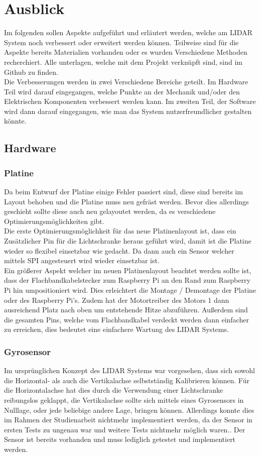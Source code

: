\chapter{Ausblick}\label{chap:ausblick}
Im folgenden sollen Aspekte aufgeführt und erläutert werden, welche am \ac{LIDAR} System noch verbessert oder erweitert werden können. Teilweise sind für die Aspekte bereits Materialien vorhanden oder es wurden Verschiedene Methoden recherchiert. Alle unterlagen, welche mit dem Projekt verknüpft sind, sind im Github zu finden.\\
Die Verbesserungen werden in zwei Verschiedene Bereiche geteilt. Im Hardware Teil wird darauf eingegangen, welche Punkte an der Mechanik und/oder den Elektrischen Komponenten verbessert werden kann. Im zweiten Teil, der Software wird dann darauf eingegangen, wie man das System nutzerfreundlicher gestalten könnte.  
\section{Hardware}
\subsection{Platine}
Da beim Entwurf der Platine einige Fehler passiert sind, diese sind bereits im Layout behoben und die Platine muss neu gefräst werden. Bevor dies allerdings geschieht sollte diese auch neu gelayoutet werden, da es verschiedene Optimierungsmöglichkeiten gibt. \\
Die erste Optimierungsmöglichkeit für das neue Platinenlayout ist, dass ein Zusätzlicher Pin für die Lichtschranke heraus geführt wird, damit ist die Platine wieder so flexibel einsetzbar wie gedacht. Da dann auch ein Sensor welcher mittels \ac{SPI} angesteuert wird wieder einsetzbar ist.\\
Ein größerer Aspekt welcher im neuen Platinenlayout beachtet werden sollte ist, dass der Flachbandkabelstecker zum Raspberry Pi an den Rand zum Raspberry Pi hin umpositioniert wird. Dies erleichtert die Montage / Demontage der Platine oder des Raspberry Pi's. Zudem hat der Motortreiber des Motors 1 dann ausreichend Platz nach oben um entstehende Hitze abzuführen. Außerdem sind die gesamten Pins, welche vom Flachbandkabel verdeckt werden dann einfacher zu erreichen, dies bedeutet eine einfachere Wartung des \ac{LIDAR} Systems.
\subsection{Gyrosensor}
Im ursprünglichen Konzept des \ac{LIDAR} Systems war vorgesehen, dass sich sowohl die Horizontal- als auch die Vertikalachse selbstständig Kalibrieren können. Für die Horizontalachse hat dies durch die Verwendung einer Lichtschranke reibungslos geklappt, die Vertikalachse sollte sich mittels eines Gyrosensors in Nulllage, oder jede beliebige andere Lage, bringen können. Allerdings konnte dies im Rahmen der Studienarbeit nichtmehr implementiert werden, da der Sensor in ersten Tests zu ungenau war und weitere Tests nichtmehr möglich waren.. Der Sensor  ist bereits vorhanden und muss lediglich getestet und implementiert werden.
